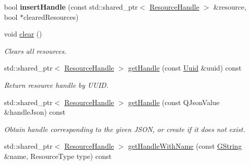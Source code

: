 \begin{Indent}
\begin{DoxyCompactItemize}
\mbox{\label{classrev_1_1_resource_cache_a04f4f8aa00b3acf190a13e6542e742c9}} 
bool {\bfseries insert\+Handle} (const std\+::shared\+\_\+ptr$<$ \mbox{\hyperlink{classrev_1_1_resource_handle}{Resource\+Handle}} $>$ \&resource, bool $\ast$cleared\+Resources)
\item 
\mbox{\label{classrev_1_1_resource_cache_ab5af062519ea38a958ef59640e0345cf}} 
void \mbox{\hyperlink{classrev_1_1_resource_cache_ab5af062519ea38a958ef59640e0345cf}{clear}} ()
\begin{DoxyCompactList}\small\item\em Clears all resources. \end{DoxyCompactList}\item 
\mbox{\label{classrev_1_1_resource_cache_a2238b0144c3f08fb5213e038f725e4d6}} 
std\+::shared\+\_\+ptr$<$ \mbox{\hyperlink{classrev_1_1_resource_handle}{Resource\+Handle}} $>$ \mbox{\hyperlink{classrev_1_1_resource_cache_a2238b0144c3f08fb5213e038f725e4d6}{get\+Handle}} (const \mbox{\hyperlink{classrev_1_1_uuid}{Uuid}} \&uuid) const
\begin{DoxyCompactList}\small\item\em Return resource handle by U\+U\+ID. \end{DoxyCompactList}\item 
\mbox{\label{classrev_1_1_resource_cache_ada4184b38c0bff91c416ba14587cd3c6}} 
std\+::shared\+\_\+ptr$<$ \mbox{\hyperlink{classrev_1_1_resource_handle}{Resource\+Handle}} $>$ \mbox{\hyperlink{classrev_1_1_resource_cache_ada4184b38c0bff91c416ba14587cd3c6}{get\+Handle}} (const Q\+Json\+Value \&handle\+Json) const
\begin{DoxyCompactList}\small\item\em Obtain handle corresponding to the given J\+S\+ON, or create if it does not exist. \end{DoxyCompactList}\item 
\mbox{\label{classrev_1_1_resource_cache_a04bd21a7349c334df284dcc8f9cd99b5}} 
std\+::shared\+\_\+ptr$<$ \mbox{\hyperlink{classrev_1_1_resource_handle}{Resource\+Handle}} $>$ \mbox{\hyperlink{classrev_1_1_resource_cache_a04bd21a7349c334df284dcc8f9cd99b5}{get\+Handle\+With\+Name}} (const \mbox{\hyperlink{classrev_1_1_g_string}{G\+String}} \&name, Resource\+Type type) const

\end{DoxyCompactItemize}
\end{Indent}
